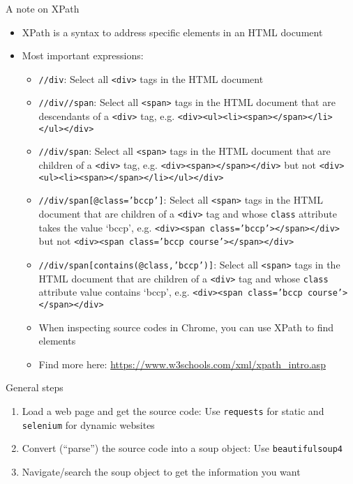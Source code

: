 \begin{frame}{A note on XPath}
\begin{itemize}
	\item XPath is a syntax to address specific elements in an HTML document
	\item Most important expressions:
	\begin{itemize}
		\item \texttt{//div}: Select all \texttt{<div>} tags in the HTML document
		\item \texttt{//div//span}: Select all \texttt{<span>} tags in the HTML document that are descendants of a \texttt{<div>} tag, e.g. \texttt{<div><ul><li><span></span></li></ul></div>}
		\item \texttt{//div/span}: Select all \texttt{<span>} tags in the HTML document that are children of a \texttt{<div>} tag, e.g. \texttt{<div><span></span></div>} but not \texttt{<div><ul><li><span></span></li></ul></div>}

\framebreak
		
		\item \texttt{//div/span[@class='bccp']}: Select all \texttt{<span>} tags in the HTML document that are children of a \texttt{<div>} tag and whose \texttt{class} attribute takes the value `bccp', e.g. \texttt{<div><span class='bccp'></span></div>} but not \texttt{<div><span class='bccp course'></span></div>}
		\item \texttt{//div/span[contains(@class,'bccp')]}: Select all \texttt{<span>} tags in the HTML document that are children of a \texttt{<div>} tag and whose \texttt{class} attribute value contains `bccp', e.g. \texttt{<div><span class='bccp course'></span></div>}
		\item When inspecting source codes in Chrome, you can use XPath to find elements
		\item Find more here: \url{https://www.w3schools.com/xml/xpath_intro.asp}
	\end{itemize}
\end{itemize}

\end{frame}

\begin{frame}[fragile]{General steps}
\begin{enumerate}
	\item Load a web page and get the source code: Use \texttt{requests} for static and \texttt{selenium} for dynamic websites
	\item Convert (``parse'') the source code into a soup object: Use \texttt{beautifulsoup4}
	\item Navigate/search the soup object to get the information you want
\end{enumerate}
\end{frame}

